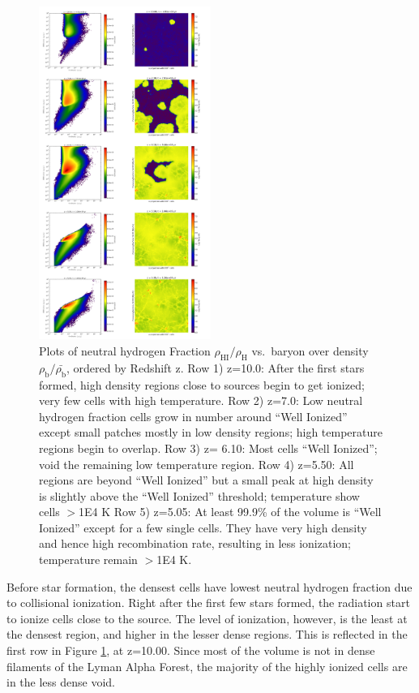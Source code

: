 \documentclass[letterpaper,10pt]{article}
\renewcommand{\(}{\left(}
\renewcommand{\)}{\right)}
\begin{document}
\begin{figure}
 \includegraphics[width=0.5\textwidth]{color_phase_slice.png}
  \caption{\footnotesize Plots of neutral hydrogen Fraction
    $\rho_\mathrm{HI}/\rho_\mathrm{H}$ vs.~baryon over density $\rho_\mathrm{b}/\bar{\rho_\mathrm{b}}$, ordered by
    Redshift z.  Row 1) z=10.0: After the first stars formed, high
    density regions close to sources begin to get ionized; very few cells with high temperature. Row 2)
    z=7.0: Low neutral hydrogen fraction cells grow in number around ``Well Ionized'' except
    small patches mostly in low density regions; high temperature regions begin to overlap.  
    Row 3) z= 6.10:  Most cells ``Well Ionized''; void the remaining low temperature region.  
    Row 4) z=5.50: All regions are beyond ``Well Ionized'' but a small
    peak at high density is slightly above the ``Well Ionized''
    threshold; temperature show cells $>$1E4 K  Row 5) z=5.05: At least 99.9\% of the volume is
    ``Well Ionized'' except for a few single cells. They have very high
    density and hence high recombination rate, resulting in less
    ionization; temperature remain $>$1E4 K.}
  \label{DensityHIHFraction}
\end{figure}

Before star formation, the densest cells have lowest neutral hydrogen
fraction due to collisional ionization.  Right after the first few stars
formed, the radiation start to ionize cells close to the source.
The level of ionization, however, is the least at the densest
region, and higher in the lesser dense regions.  This is
reflected in the first row in Figure \ref{DensityHIHFraction}, at
z=10.00.  Since most of the volume is not in dense filaments of the
Lyman Alpha Forest, the majority of the highly ionized cells are in
the less dense void.
\end{document}
